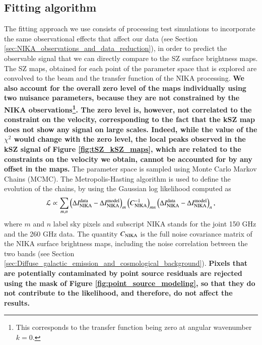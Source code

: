 \documentclass[twocolumn,traditabstract]{aa}
\begin{document}
\subsection{Fitting algorithm}\label{sec:Fitting_algorithm}
The fitting approach we use consists of processing test simulations to incorporate the same observational effects that affect our data (see Section \ref{sec:NIKA_observations_and_data_reduction}), in order to predict the observable signal that we can directly compare to the SZ surface brightness maps. The SZ maps, obtained for each point of the parameter space that is explored are convolved to the beam and the transfer function of the NIKA processing. {\bf We also account for the overall zero level of the maps individually using two nuisance parameters, because they are not constrained by the NIKA observations\footnote{This corresponds to the transfer function being zero at angular wavenumber $k=0$.}. The zero level is, however, not correlated to the constraint on the velocity, corresponding to the fact that the kSZ map does not show any signal on large scales. Indeed, while the value of the $\chi^2$ would change with the zero level, the local peaks observed in the kSZ signal of Figure \ref{fig:tSZ_kSZ_maps}, which are related to the constraints on the velocity we obtain, cannot be accounted for by any offset in the maps.} The parameter space is sampled using Monte Carlo Markov Chains (MCMC). The Metropolis-Hasting algorithm \citep[e.g.,][]{Chib1995} is used to define the evolution of the chains, by using the Gaussian log likelihood computed as
\begin{equation}
\mathcal{L} \propto \sum\limits_{m,n} \left(\Delta I_{\rm NIKA}^{\rm data} - \Delta I_{\rm NIKA}^{\rm model}\right)_m \left(C_{\rm NIKA}^{-1}\right)_{mn} \left(\Delta I_{\rm NIKA}^{\rm data} - \Delta I_{\rm NIKA}^{\rm model}\right)_n,
\label{eq:likelihood1}
\end{equation}
where $m$ and $n$ label sky pixels and subscript NIKA stands for the joint 150 GHz and the 260 GHz data. The quantity $C_{\rm NIKA}$ is the full noise covariance matrix of the NIKA surface brightness maps, including the noise correlation between the two bands (see Section \ref{sec:Diffuse_galactic_emission_and_cosmological_background}). {\bf Pixels that are potentially contaminated by point source residuals are rejected using the mask of Figure \ref{fig:point_source_modeling}, so that they do not contribute to the likelihood, and therefore, do not affect the results.}
\end{document}

